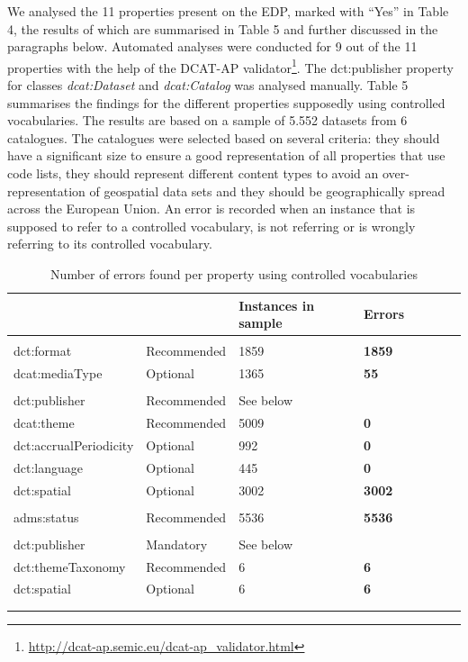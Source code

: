 \documentclass[<options>]{elsarticle}
\begin{document}
We analysed the 11 properties present on the EDP, marked with “Yes” in Table 4, the results of which are summarised in Table 5 and further discussed in the paragraphs below. Automated analyses were conducted for 9 out of the 11 properties with the help of the DCAT-AP validator\footnote{\href{  http://dcat-ap.semic.eu/dcat-ap\_validator.html }{    http://dcat-ap.semic.eu/dcat-ap\_validator.html}}. The dct:publisher property for classes \textit{dcat:Dataset} and \textit{dcat:Catalog} was analysed manually. 
Table 5 summarises the findings for the different properties supposedly using controlled vocabularies. The results are based on a sample of 5.552 datasets from 6 catalogues. The catalogues were selected based on several criteria: they should have a significant size to ensure a good representation of all properties that use code lists, they should represent different content types to avoid an over-representation of geospatial data sets and they should be geographically spread across the European Union. An error is recorded when an instance that is supposed to refer to a controlled vocabulary, is not referring or is wrongly referring to its controlled vocabulary.

\begin{longtable}{*8l}
\rowcolor{white!10}{\textbf{Property}} & {} & {\textbf{Instances in sample}} & {\textbf{Errors}} \\ \hline
\rowcolor{gray!10}{Distribution} & {} & {} & {} \\ \hline
\rowcolor{white!10} dct:format &Recommended &1859 &\textbf{1859} \\ \hline
\rowcolor{white!10} dcat:mediaType &Optional &1365 &\textbf{55} \\ \hline
\rowcolor{gray!10}{Dataset} & {} & {} & {} \\ \hline
\rowcolor{white!10} dct:publisher &Recommended &See below \\ \hline
\rowcolor{white!10} dcat:theme &Recommended &5009 &\textbf{0} \\ \hline
\rowcolor{white!10} dct:accrualPeriodicity &Optional &992 &\textbf{0} \\ \hline
\rowcolor{white!10} dct:language &Optional &445 &\textbf{0} \\ \hline
\rowcolor{white!10} dct:spatial &Optional &3002 &\textbf{3002} \\ \hline
\rowcolor{gray!10}{CatalogRecord} & {} & {} & {} \\ \hline
\rowcolor{white!10} adms:status &Recommended &5536 &\textbf{5536} \\ \hline
\rowcolor{gray!10}{Catalog} & {} & {} & {} \\ \hline
\rowcolor{white!10} dct:publisher &Mandatory &See below\\ \hline
\rowcolor{white!10} dct:themeTaxonomy &Recommended &6 &\textbf{6} \\ \hline
\rowcolor{white!10} dct:spatial &Optional &6 &\textbf{6} \\ \hline
\\
\caption{Number of errors found per property using controlled vocabularies }
\end{longtable}
\end{document}

